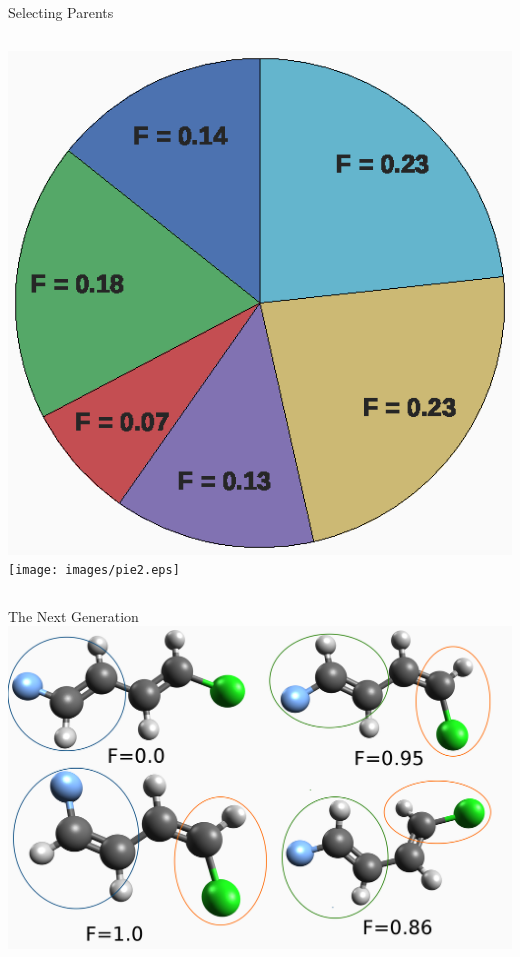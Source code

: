 \documentclass[10pt]{beamer}
\begin{document}
{{\begin{frame}{Selecting Parents}
\begin{columns}[c]
\begin{column}{0.48\textwidth}
\begin{overprint}
				\includegraphics[width=\linewidth]{images/pie1.eps}
				\onslide<6>\texttt{[image: images/pie2.eps]}
			\end{overprint}
		\end{column}
	\end{columns}
\end{frame}

{%
\begin{frame}{The Next Generation}
    \includegraphics[width=\linewidth]{images/nextgen.png}
\end{frame}
}


}}
\end{document}
